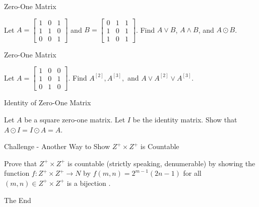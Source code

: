 \documentclass{beamer}
\begin{document}
\begin{frame}[t]{Zero-One Matrix}
    \begin{example}
        Let $A = \begin{bmatrix}
        1 & 0 & 1 \\
        1 & 1 & 0 \\
        0 & 0 & 1
    \end{bmatrix}$ and $B = \begin{bmatrix}
        0 & 1 & 1 \\
        1 & 0 & 1 \\
        1 & 0 & 1
    \end{bmatrix}$. Find $A \vee B$, $A \wedge B$, and $A \odot B$.
    \end{example}
\end{frame}

\begin{frame}[t]{Zero-One Matrix}
    \begin{example}
        Let $A = \begin{bmatrix}
            1 & 0 & 0 \\
            1 & 0 & 1 \\
            0 & 1 & 0
        \end{bmatrix}$. Find $A^{[2]}, A^{[3]},$ and $A \vee A^{[2]} \vee A^{[3]}$. 
    \end{example}
\end{frame}

\begin{frame}[t]{Identity of Zero-One Matrix}
    \begin{example}
        Let $A$ be a square zero-one matrix. Let $I$ be the identity matrix. Show that $A \odot I = I \odot A = A$. 
    \end{example}
\end{frame}

\begin{frame}{Challenge - Another Way to Show $Z^+ \times Z^+$ is Countable}
    \begin{example}
        Prove that $Z^+ \times Z^+$ is countable (strictly speaking, denumerable) by showing the function $f: Z^+ \times Z^+ \to N$ by $f(m,n) = 2^{m-1}(2n-1)$ for all $(m,n) \in Z^+ \times Z^+$ is a bijection
        . 
    \end{example}
    
    \vspace{38mm}

    \begin{center}
        The End
    \end{center}
\end{frame}
\end{document}
